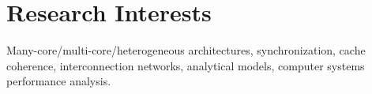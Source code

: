 \section{\sc Research Interests}

Many-core/multi-core/heterogeneous architectures, synchronization, cache coherence, interconnection networks, analytical models, computer systems performance analysis.
